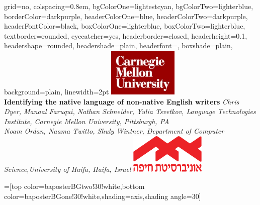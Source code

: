 \documentclass[landscape,final]{baposter}
\begin{document}
\begin{poster}{
  grid=no,
  colspacing=0.8em,
  bgColorOne=lightestcyan, %
  bgColorTwo=lighterblue, %
  borderColor=darkpurple, %
  headerColorOne=blue, %
  headerColorTwo=darkpurple, %
  headerFontColor=black,
  boxColorOne=lighterblue, %
  boxColorTwo=lighterblue, %
  textborder=rounded, %
  eyecatcher=yes,
  headerborder=closed,
  headerheight=0.1\textheight,
  headershape=rounded, %
  headershade=plain,
  headerfont=\Large\textsf, %
  boxshade=plain,
  background=plain,
  linewidth=2pt
  }
  {%
\includegraphics[width=9em]{img/CarnegieMellonUniversity}\\
} %
  {\bf %
  Identifying the native language of non-native English writers
  }
  {\large\sl %
  Chris Dyer, Manaal Faruqui, Nathan Schneider, Yulia Tsvetkov, Language Technologies Institute,
  Carnegie Mellon University, Pittsburgh, PA
  \large
  \\Noam Ordan, Naama Twitto, Shuly Wintner,
  Department of Computer Science,University of Haifa, Haifa, Israel
  }
  {  \includegraphics[height=5.1em]{img/University_of_Haifa_logo} %
  }

  =[top color=baposterBGtwo!30!white,bottom color=baposterBGone!30!white,shading=axis,shading angle=30]



\end{poster}
\end{document}
